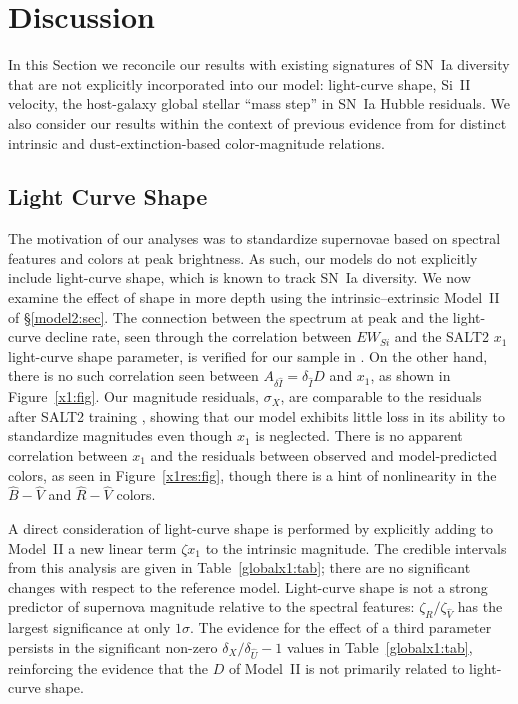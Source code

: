 \documentclass{aastex61}   	%
\begin{document}
\section{Discussion}
\label{discussion:sec}
In this Section
we  reconcile our results with existing
signatures of SN~Ia diversity that are not explicitly incorporated
into our model: light-curve shape, Si~II velocity, the host-galaxy global stellar ``mass step'' in SN~Ia Hubble
residuals.
We also consider our results within the context of previous evidence from
  for distinct intrinsic and dust-extinction-based
color-magnitude relations.

\subsection{Light Curve Shape}
\label{shape:sec}
The motivation of our analyses was to standardize supernovae based on spectral features and colors at peak brightness.
As such, our models do not explicitly include light-curve shape, which is known to track SN~Ia diversity.
We now examine the effect of shape in more depth using the intrinsic--extrinsic Model~II of \S\ref{model2:sec}.
The connection between the spectrum at peak and the light-curve decline rate, seen through
the correlation between $EW_{Si}$ and the SALT2 $x_1$ light-curve shape parameter, is verified
for our sample in \citet{2017Chotard}.
On the other hand, there is no such correlation seen between $A_{\delta {\hat{I}}} = \delta_{\hat{I}} D$ and $x_1$, as shown in Figure~\ref{x1:fig}. 
Our magnitude residuals, $\sigma_X$, are comparable to the residuals after SALT2 training
\citep{2010A&A...523A...7G}, showing that our model exhibits little loss in its ability to standardize
magnitudes even though $x_1$ is neglected.
There is no apparent correlation
between $x_1$ and the residuals between observed and model-predicted colors, as seen in
Figure~\ref{x1res:fig},
though there is a hint of nonlinearity in the ${\hat{B}}-{\hat{V}}$ and ${\hat{R}}-{\hat{V}}$ colors.

A direct consideration of light-curve shape is
performed by explicitly adding to Model~II a new linear term $\zeta x_1$ to the 
intrinsic magnitude. The credible intervals
from this analysis are given in Table~\ref{globalx1:tab}; there are no significant changes with respect to the reference model. 
Light-curve shape is not a strong predictor of supernova magnitude relative to the spectral features: $\zeta_{\hat{R}}/\zeta_{\hat{V}}$
has the largest significance  at 
only
$1\sigma$.
The evidence for the effect of a third parameter persists in the significant  non-zero  $\delta_X/\delta_{\hat{U}}-1$ values
in Table~\ref{globalx1:tab}, reinforcing the evidence that the $D$ of Model~II is not primarily related to light-curve shape.
\end{document}
